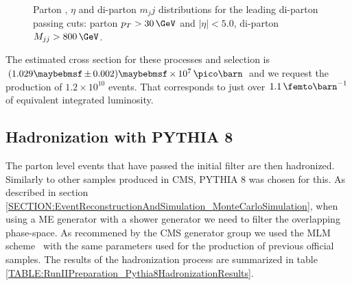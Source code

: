 \begin{figure}[!htp]
\\
\caption[Key variables of events passing the parton level filter]{Parton \pt, $\eta$ and di-parton $m_jj$ distributions for the leading di-parton passing cuts: parton $p_{T}>30\,\GeV$ and $|\eta|<5.0$, di-parton $M_{jj}>800\,\GeV$.}
\label{FIGURE:RunIIPreparation_PassPartonFilterDistributions}
\end{figure}

The estimated cross section for these processes and selection is $(1.029 \pm 0.002) \times 10^7 \,\pico\barn$ and we request the production of $1.2 \times 10^{10}$ events. That corresponds to just over $1.1\,\femto\barn^{-1}$ of equivalent integrated luminosity. 

\subsection{Hadronization with \textsc{PYTHIA 8}}
\label{SUBSECTION:RunIIPreparation_HadronizationWithPythia8}


The parton level events that have passed the initial filter are then hadronized. Similarly to other samples produced in \gls{CMS}, \textsc{PYTHIA 8} was chosen for this. As described in section \ref{SECTION:EventReconstructionAndSimulation_MonteCarloSimulation}, when using a \gls{ME} generator with a shower generator we need to filter the overlapping phase-space. As recommened by the \gls{CMS} generator group we used the MLM scheme~\cite{ARTICLE:MLMScheme} with the same parameters used for the production of previous official samples. The results of the hadronization process are summarized in table \ref{TABLE:RunIIPreparation_Pythia8HadronizationResults}.

